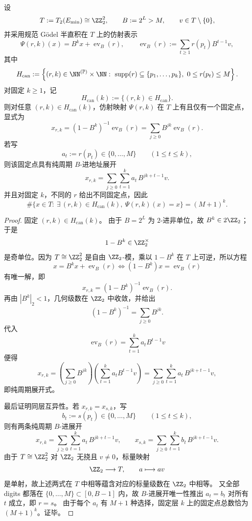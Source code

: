\begin{theorem}\label{thm:conclusion-canonical-slice-exact-fixedpoint-count}
设
\[
T:=T_2(E_{\min})\cong \ZZ_2^2,
\qquad
B:=2^L>M,
\qquad
v\in T\setminus\{0\},
\]
并采用规范 Gödel 半直积在 \(T\) 上的仿射表示
\[
\Psi(r,k)(x)=B^k x+\operatorname{ev}_B(r),
\qquad
\operatorname{ev}_B(r):=\sum_{t\ge 1}r(p_t)B^{t-1}v,
\]
其中
\[
H_{\mathrm{can}}
:=
\left\{
(r,k)\in \NN^{(\mathbb P)}\times\NN:\ 
\operatorname{supp}(r)\subseteq\{p_1,\dots,p_k\},\
0\le r(p_t)\le M
\right\}.
\]
对固定 \(k\ge 1\)，记
\[
H_{\mathrm{can}}(k):=\{(r,k)\in H_{\mathrm{can}}\}.
\]
则对任意 \((r,k)\in H_{\mathrm{can}}(k)\)，仿射映射 \(\Psi(r,k)\) 在 \(T\) 上有且仅有一个固定点，显式为
\[
\boxed{\;
x_{r,k}
=(1-B^k)^{-1}\operatorname{ev}_B(r)
=\sum_{j\ge 0}B^{jk}\operatorname{ev}_B(r).\;}
\]
若写
\[
a_t:=r(p_t)\in\{0,\dots,M\}
\qquad(1\le t\le k),
\]
则该固定点具有纯周期 \(B\)-进地址展开
\[
\boxed{\;
x_{r,k}
=
\sum_{j\ge 0}\sum_{t=1}^{k}a_t\,B^{jk+t-1}v.\;}
\]
并且对固定 \(k\)，不同的 \(r\) 给出不同固定点，因此
\[
\boxed{\;
\#\{x\in T:\ \exists\,(r,k)\in H_{\mathrm{can}}(k),\ \Psi(r,k)(x)=x\}
=(M+1)^k.\;}
\]
\end{theorem}
\begin{proof}
固定 \((r,k)\in H_{\mathrm{can}}(k)\)。
由于 \(B=2^L\) 为 \(2\)-进非单位，故 \(B^k\in 2\ZZ_2\)；于是
\[
1-B^k\in \ZZ_2^\times
\]
是奇单位。因为 \(T\cong \ZZ_2^2\) 是自由 \(\ZZ_2\)-模，乘以 \(1-B^k\) 在 \(T\) 上可逆，所以方程
\[
x=B^k x+\operatorname{ev}_B(r)
\iff
(1-B^k)x=\operatorname{ev}_B(r)
\]
有唯一解，即
\[
x_{r,k}=(1-B^k)^{-1}\operatorname{ev}_B(r).
\]
再由 \(|B^k|_2<1\)，几何级数在 \(\ZZ_2\) 中收敛，并给出
\[
(1-B^k)^{-1}=\sum_{j\ge 0}B^{jk}.
\]
代入
\[
\operatorname{ev}_B(r)=\sum_{t=1}^{k}a_t B^{t-1}v
\]
便得
\[
x_{r,k}
=
\left(\sum_{j\ge 0}B^{jk}\right)\left(\sum_{t=1}^{k}a_tB^{t-1}v\right)
=
\sum_{j\ge 0}\sum_{t=1}^{k}a_t\,B^{jk+t-1}v,
\]
即纯周期展开式。

最后证明同层互异性。若 \(x_{r,k}=x_{s,k}\)，写
\[
b_t:=s(p_t)\in\{0,\dots,M\}
\qquad(1\le t\le k),
\]
则有两条纯周期 \(B\)-进展开
\[
x_{r,k}
=
\sum_{j\ge 0}\sum_{t=1}^{k}a_t\,B^{jk+t-1}v,
\qquad
x_{s,k}
=
\sum_{j\ge 0}\sum_{t=1}^{k}b_t\,B^{jk+t-1}v.
\]
由于 \(T\cong \ZZ_2^2\) 对 \(\ZZ_2\) 无挠且 \(v\neq 0\)，标量映射
\[
\ZZ_2\longrightarrow T,
\qquad
a\longmapsto av
\]
是单射，故上述两式在 \(T\) 中相等蕴含对应的标量级数在 \(\ZZ_2\) 中相等。
又全部 digits 都落在 \(\{0,\dots,M\}\subset [0,B-1]\) 内，故 \(B\)-进展开唯一性推出 \(a_t=b_t\) 对所有 \(t\) 成立，即 \(r=s\)。
由于每个 \(a_t\) 有 \(M+1\) 种选择，固定层 \(k\) 上的固定点总数恰为 \((M+1)^k\)。证毕。
\end{proof}

